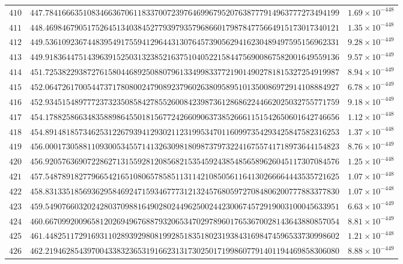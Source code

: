 \documentclass[12pt,reqno]{amsart}
\theoremstyle{remark}
\begin{document}
\begin{longtable}{clc}
$410$ & $447.7841666351083466367061183370072397646996795207638777914963777273494199$ & $1.69\times 10^{-448}$ \\
$411$ & $448.4698467905175264513403845277939793579686601798784775664915173017340121$ & $1.35\times 10^{-448}$ \\
$412$ & $449.5361092367448395491755941296443130764573905629416230489497595156962331$ & $9.28\times 10^{-449}$ \\
$413$ & $449.9183644751439639152503132385216375104052215844756900867582001649559136$ & $9.57\times 10^{-449}$ \\
$414$ & $451.7253822938727615804468925088079613349983377219014902781815327254919987$ & $8.94\times 10^{-449}$ \\
$415$ & $452.0647261700544737178080024790892379602638095895101350086972914108884927$ & $6.78\times 10^{-449}$ \\
$416$ & $452.9345154897772373235085842785526008423987361286862244662025032755771759$ & $9.18\times 10^{-449}$ \\
$417$ & $454.1788258663483588986455018156772426609063738526661151542650601642746656$ & $1.12\times 10^{-448}$ \\
$418$ & $454.8914818573462531226793941293021123199534701160997354293425847582316253$ & $1.37\times 10^{-448}$ \\
$419$ & $456.0001730588110930053455714132630981809873797322416755741718973644154823$ & $8.76\times 10^{-449}$ \\
$420$ & $456.9205763690722862713155928120856821535459243854856589626045117307084576$ & $1.25\times 10^{-448}$ \\
$421$ & $457.5487891827796654216510806578585113114210850561164130266664443535721625$ & $1.07\times 10^{-448}$ \\
$422$ & $458.8313351856936295846924715934677731213245768059727084806200777883377830$ & $1.07\times 10^{-448}$ \\
$423$ & $459.5490766032024280370988164902802449625002442300674572919003100045633951$ & $6.63\times 10^{-449}$ \\
$424$ & $460.6670992009658120269496768879320653470297896017653670028143643880857054$ & $8.81\times 10^{-449}$ \\
$425$ & $461.4482511729169311028939298081992851835180231938431698474596533730998602$ & $1.21\times 10^{-448}$ \\
$426$ & $462.2194628543970043383236531916623131730250171998607791401194469858306080$ & $8.88\times 10^{-449}$ \\

\end{longtable}
\end{document}
